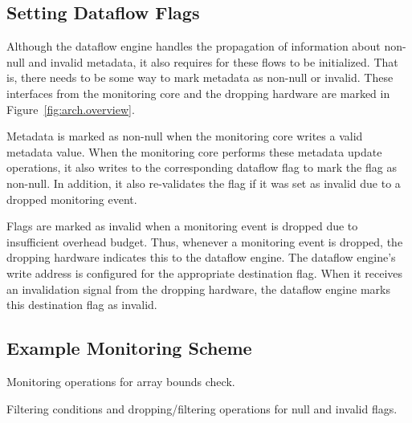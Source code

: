 \subsection{Setting Dataflow Flags}
\label{sec:arch.dropping}

Although the dataflow engine handles the propagation of information about
non-null and invalid metadata, it also requires for these flows to be
initialized. That is, there needs to be some way to mark metadata as non-null
or invalid. These interfaces from the monitoring core and the dropping hardware
are marked in Figure~\ref{fig:arch.overview}.

Metadata is marked as non-null when the monitoring core writes a valid metadata
value. When the monitoring core performs these metadata update operations, it
also writes to the corresponding dataflow flag to mark the flag as non-null. In
addition, it also re-validates the flag if it was set as invalid due to a
dropped monitoring event.

Flags are marked as invalid when a monitoring event is dropped due to
insufficient overhead budget. Thus, whenever a monitoring event is dropped, the
dropping hardware indicates this to the dataflow engine. The dataflow engine's
write address is configured for the appropriate destination flag. When it
receives an invalidation signal from the dropping hardware, the
dataflow engine marks this destination flag as invalid.

\subsection{Example Monitoring Scheme}

\begin{table}[tb]
  \begin{center}
    \begin{small}
    
    \end{small}
    \caption{Monitoring operations for array bounds check.}
    \label{tab:arch.monitor}
    \vspace{-0.2in}
  \end{center}
\end{table}

\begin{table}[tb]
  \begin{center}
    \begin{small}
    
    \end{small}
    \caption{Filtering conditions and dropping/filtering operations for null and invalid flags.}
    \label{tab:arch.dataflow_operations}
    \vspace{-0.2in}
  \end{center}
\end{table}

